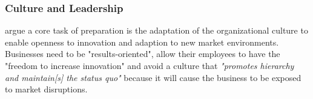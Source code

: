 \subsubsection{Culture and Leadership}
\citeauthor{hammer:2015, LucasJr200946} argue a core task of preparation is the adaptation of the organizational culture to enable openness to innovation and adaption to new market environments. Businesses need to be "results-oriented", allow their employees to have the "freedom to increase innovation"\cite{hammer:2015} and avoid a culture that \emph{"promotes hierarchy and maintain[s] the status quo"}\cite{LucasJr200946} because it will cause the business to be exposed to market disruptions.

